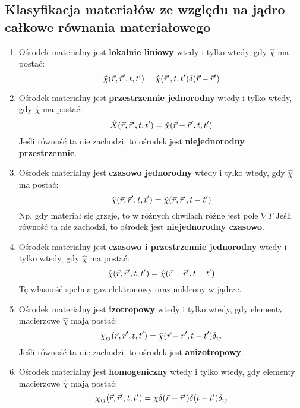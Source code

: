 \subsection{Klasyfikacja materiałów ze względu na jądro całkowe równania materiałowego}
\begin{enumerate}
\item Ośrodek materialny jest \textbf{lokalnie liniowy} wtedy i tylko wtedy, gdy $\hat{\chi}$ ma postać:
\begin{equation}\hat{\chi}(\vec{r},\vec{r}',t,t')=\hat{\chi}(\vec{r}',t,t')\delta(\vec{r}-\vec{r}')\end{equation}
\item Ośrodek materialny jest \textbf{przestrzennie jednorodny} wtedy i tylko wtedy, gdy $\hat{\chi}$ ma postać:
\begin{equation}\hat{X}(\vec{r},\vec{r}',t,t')=\hat{\chi}(\vec{r}-\vec{r}',t,t')\end{equation}
Jeśli równość ta nie zachodzi, to ośrodek jest \textbf{niejednorodny przestrzennie}.
\item Ośrodek materialny jest \textbf{czasowo jednorodny} wtedy i tylko wtedy, gdy $\hat{\chi}$ ma postać:
\begin{equation}\hat{\chi}(\vec{r},\vec{r}',t,t')=\hat{\chi}(\vec{r},\vec{r}',t-t')\end{equation}
 Np. gdy materiał się grzeje, to w różnych chwilach różne jest pole $\nabla T$
 Jeśli równość ta nie zachodzi, to ośrodek jest \textbf{niejednorodny czasowo}.
 \item Ośrodek materialny jest \textbf{czasowo i przestrzennie jednorodny} wtedy i tylko wtedy, gdy $\hat{\chi}$ ma postać:
\begin{equation}\hat{\chi}(\vec{r},\vec{r}',t,t')=\hat{\chi}(\vec{r}-\vec{r}',t-t')\end{equation}
 Tę własność spełnia gaz elektronowy oraz nukleony w jądrze.
  \item Ośrodek materialny jest \textbf{izotropowy} wtedy i tylko wtedy, gdy elementy macierzowe $\hat{\chi}$ mają postać:
\begin{equation}{\chi}_{ij}(\vec{r},\vec{r}',t,t')=\hat{\chi}(\vec{r}-\vec{r}',t-t')\delta_{ij}\end{equation}
 Jeśli równość ta nie zachodzi, to ośrodek jest \textbf{anizotropowy}.
 \item Ośrodek materialny jest \textbf{homogeniczny} wtedy i tylko wtedy, gdy elementy macierzowe $\hat{\chi}$ mają postać:
\begin{equation}{\chi}_{ij}(\vec{r},\vec{r}',t,t')={\chi}\delta(\vec{r}-\vec{r}')\delta(t-t')\delta_{ij}\end{equation}
\end{enumerate}
